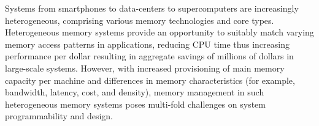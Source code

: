 
Systems from smartphones to data-centers to supercomputers are increasingly
heterogeneous, comprising various memory technologies and core types.
Heterogeneous memory systems provide an opportunity to suitably match varying
memory access patterns in applications, reducing CPU time thus increasing performance per dollar resulting
in aggregate savings of millions of dollars in large-scale systems. However,
with increased provisioning of main memory capacity per machine and differences
in memory characteristics (for example, bandwidth, latency, cost, and density),
memory management in such heterogeneous memory systems poses multi-fold
challenges on system programmability and design.

